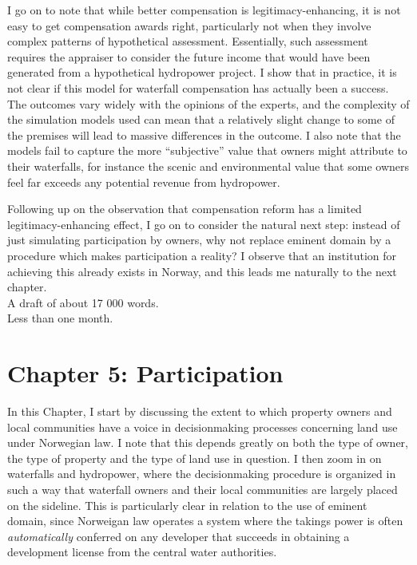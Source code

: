 \documentclass[12pt,a4paper]{article} %
\begin{document}
I go on to note that while better compensation is legitimacy-enhancing, it is not easy to get compensation awards right, particularly not when they involve complex patterns of hypothetical assessment. Essentially, such assessment requires the appraiser to consider the future income that would have been generated from a hypothetical hydropower project. I show that in practice, it is not clear if this model for waterfall compensation has actually been a success. The outcomes vary widely with the opinions of the experts, and the complexity of the simulation models used can mean that a relatively slight change to some of the premises will lead to massive differences in the outcome. I also note that the models fail to capture the more ``subjective'' value that owners might attribute to their waterfalls, for instance the scenic and environmental value that some owners feel far exceeds any potential revenue from hydropower.

Following up on the observation that compensation reform has a limited legitimacy-enhancing effect, I go on to consider the natural next step: instead of just simulating participation by owners, why not replace eminent domain by a procedure which makes participation a reality? I observe that an institution for achieving this already exists in Norway, and this leads me naturally to the next chapter. \\

 A draft of about 17 000 words. \\

 Less than one month.

\section*{Chapter 5: Participation}\label{chap5}

In this Chapter, I start by discussing the extent to which property owners and local communities have a voice in decisionmaking processes concerning land use under Norwegian law. I note that this depends greatly on both the type of owner, the type of property and the type of land use in question. I then zoom in on waterfalls and hydropower, where the decisionmaking procedure is organized in such a way that waterfall owners and their local communities are largely placed on the sideline. This is particularly clear in relation to the use of eminent domain, since Norweigan law operates a system where the takings power is often {\it automatically} conferred on any developer that succeeds in obtaining a development license from the central water authorities.
\end{document}
